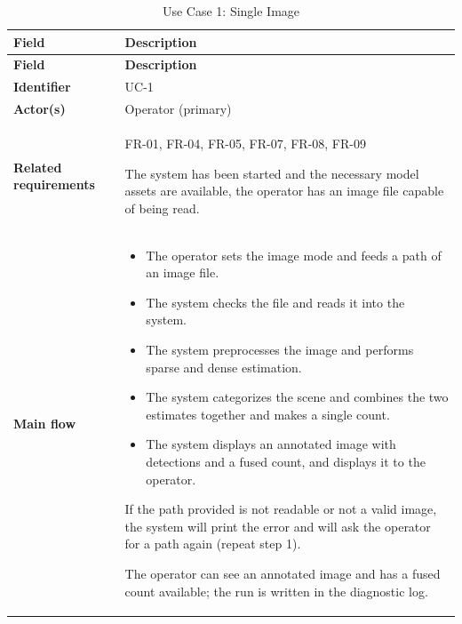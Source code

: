 \begin{longtable}{|p{3.0cm}|p{12.5cm}|}

\caption{Use Case 1: Single Image}
\label{tab:uc1} \\

\hline
\textbf{Field} & \textbf{Description} \\
\hline
\endfirsthead

\hline
\textbf{Field} & \textbf{Description} \\
\hline
\endhead

\textbf{Identifier} &
UC-1
\\
\hline

\textbf{Actor(s)} &
Operator (primary)
\\
\hline

\textbf{Related requirements} &
FR-01, FR-04, FR-05, FR-07, FR-08, FR-09

The system has been started and the necessary model assets are available, the operator has an image file capable of being read.
\\
\hline

\textbf{Main flow} &
\begin{itemize}[leftmargin=16pt, itemsep=0pt, topsep=0pt]
    \item The operator sets the image mode and feeds a path of an image file.
    \item The system checks the file and reads it into the system.
    \item The system preprocesses the image and performs sparse and dense estimation.
    \item The system categorizes the scene and combines the two estimates together and makes a single count.
    \item The system displays an annotated image with detections and a fused count, and displays it to the operator.
\end{itemize}

If the path provided is not readable or not a valid image, the system will print the error and will ask the operator for a path again (repeat step 1).

The operator can see an annotated image and has a fused count available; the run is written in the diagnostic log.
\\
\hline

\end{longtable}


